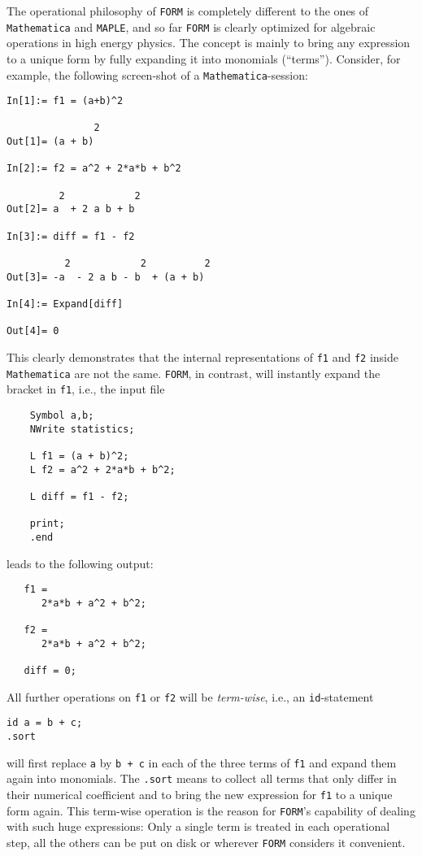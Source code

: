 The operational philosophy of {\tt FORM} is completely different to the
ones of {\tt Mathematica} and {\tt MAPLE}, and so far {\tt FORM} is
clearly optimized for algebraic operations in high energy physics.
The concept is mainly to bring any expression to a unique form by
fully expanding it into monomials (``terms''). Consider, for example, the
following screen-shot of a {\tt Mathematica}-session:
\begin{verbatim}
In[1]:= f1 = (a+b)^2

               2
Out[1]= (a + b)

In[2]:= f2 = a^2 + 2*a*b + b^2

         2            2
Out[2]= a  + 2 a b + b

In[3]:= diff = f1 - f2

          2            2          2
Out[3]= -a  - 2 a b - b  + (a + b)

In[4]:= Expand[diff]

Out[4]= 0
\end{verbatim}
This clearly demonstrates that the internal representations of {\tt f1}
and {\tt f2} inside {\tt Mathematica} are not the same.
{\tt FORM}, in contrast, will instantly expand the bracket in {\tt f1},
i.e., the input file
\begin{verbatim}
    Symbol a,b;
    NWrite statistics;

    L f1 = (a + b)^2;
    L f2 = a^2 + 2*a*b + b^2;

    L diff = f1 - f2;

    print;
    .end
\end{verbatim}
leads to the following output:
\begin{verbatim}
   f1 =
      2*a*b + a^2 + b^2;

   f2 =
      2*a*b + a^2 + b^2;

   diff = 0;
\end{verbatim}
All further operations on {\tt f1} or {\tt f2} will be {\it term-wise},
i.e., an {\tt id}-statement
\begin{verbatim}
id a = b + c;
.sort
\end{verbatim}
will first replace {\tt a} by {\tt b + c} in each of the three terms of
{\tt f1} and expand them again into monomials. The {\tt .sort} means to
collect all terms that only differ in their numerical coefficient and to
bring the new expression for {\tt f1} to a unique form again.  This
term-wise operation is the reason for {\tt FORM}'s capability of
dealing with such huge expressions: Only a single term is treated in
each operational step, all the others can be put on disk or wherever
{\tt FORM} considers it convenient.

